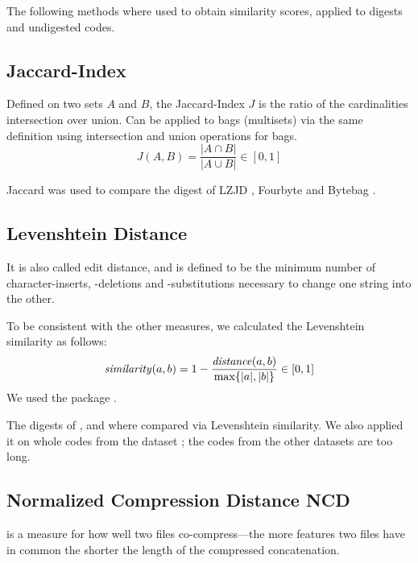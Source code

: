 \documentclass[../main.tex]{subfiles}
\begin{document}
The following methods where used to obtain similarity scores, applied to digests and undigested codes.

\subsection{Jaccard-Index \label{sec:jacc}}

Defined on two sets $A$ and $B$, the Jaccard-Index $J$ is the ratio of the cardinalities intersection over union. Can be applied to bags (multisets) via the same definition using intersection and union operations for bags.
\begin{equation}
  J(A,B) = \dfrac{|A \cap B|}{|A \cup B|} \in [0,1]
  \label{eq:jaccard}
\end{equation}

Jaccard was used to compare the digest of LZJD , Fourbyte  and Bytebag .

\subsection{Levenshtein Distance \label{sec:lev}}

It is also called edit distance, and is defined to be the minimum number of character-inserts, -deletions and -substitutions necessary to change one string into the other.

To be consistent with the other measures, we calculated the Levenshtein similarity as follows:
\begin{equation}
  \mbox{\textit{similarity}}(a, b) = 1 - \dfrac{\mbox{\textit{distance}}(a, b)}{\max\{|a|, |b|\}} \in [0,1]
  \label{eq:levSim}
\end{equation}
We used the  package \cite{pyLev}.

The digests of  ,   and   where compared via Levenshtein similarity. We also applied it on whole codes from the  dataset ; the codes from the other datasets are too long.

\subsection{Normalized Compression Distance NCD \label{sec:ncd}}

 is a measure for how well two files co-compress---the more features two files have in common the shorter the length of the compressed concatenation.
\end{document}
